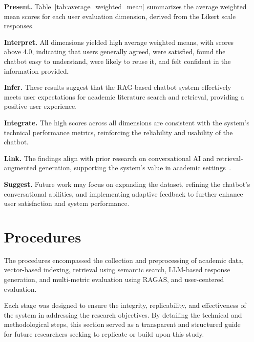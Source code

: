 \begin{refsection}
\textbf{Present.} Table~\ref{tab:average_weighted_mean} summarizes the average weighted mean scores for each user evaluation dimension, derived from the Likert scale responses.

\textbf{Interpret.} All dimensions yielded high average weighted means, with scores above 4.0, indicating that users generally agreed, were satisfied, found the chatbot easy to understand, were likely to reuse it, and felt confident in the information provided.

\textbf{Infer.} These results suggest that the RAG-based chatbot system effectively meets user expectations for academic literature search and retrieval, providing a positive user experience.

\textbf{Integrate.} The high scores across all dimensions are consistent with the system’s technical performance metrics, reinforcing the reliability and usability of the chatbot.

\textbf{Link.} The findings align with prior research on conversational AI and retrieval-augmented generation, supporting the system’s value in academic settings~\cite{holmes2023chatbot, ameli2024ranking, lin2024satisfaction}.

\textbf{Suggest.} Future work may focus on expanding the dataset, refining the chatbot’s conversational abilities, and implementing adaptive feedback to further enhance user satisfaction and system performance.


\section{Procedures}

The procedures encompassed the collection and preprocessing of academic data, vector-based indexing, retrieval using semantic search, LLM-based response generation, and multi-metric evaluation using RAGAS, and user-centered evaluation.

Each stage was designed to ensure the integrity, replicability, and effectiveness of the system in addressing the research objectives. By detailing the technical and methodological steps, this section served as a transparent and structured guide for future researchers seeking to replicate or build upon this study.




\end{refsection}
